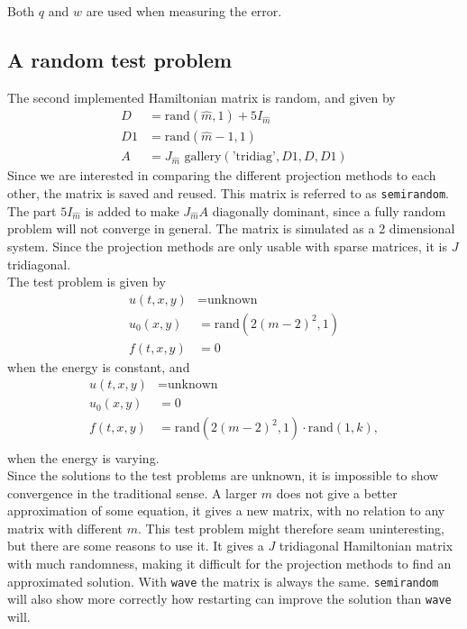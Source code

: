 \noindent Both $q$ and $w$ are used when measuring the error. \\

\subsection{A random test problem} %
The second implemented Hamiltonian matrix is random, and given by
\begin{equation*}
\begin{aligned}
D &= \text{rand}(\hat{m},1) + 5 I_{\hat{m}} \\
D1 & = \text{rand}(\hat{m}-1,1) \\
A &= J_{\hat{m}} \text{ gallery}(\text{'tridiag'},D1,D,D1)
\end{aligned}
\end{equation*}
Since we are interested in comparing the different projection methods to each other, the matrix is saved and reused. This matrix is referred to as \texttt{semirandom}. The part $5 I_{\hat{m}} $ is added to make $J_{\hat{m}}A$ diagonally dominant, since a fully random problem will not converge in general. The matrix is simulated as a 2 dimensional system. Since the projection methods are only usable with sparse matrices, it is $J$ tridiagonal.\\
The test problem is given by
\begin{equation*}
\begin{aligned}
u(t,x,y) &= \text{unknown} \\
u_0(x,y) &= \text{rand} (2 (m-2)^2,1) \\
f(t,x,y) &= 0
\end{aligned}
\end{equation*}
when the energy is constant, and 
\begin{equation*}
\begin{aligned}
u(t,x,y) &= \text{unknown} \\
u_0(x,y) &= 0 \\
f(t,x,y) &= \text{rand} (2 (m-2)^2,1) \cdot \text{rand}(1,k), \\
\end{aligned}
\end{equation*}
when the energy is varying.\\

\noindent Since the solutions to the test problems are unknown, it is impossible to show convergence in the traditional sense. A larger $m$ does not give a better approximation of some equation, it gives a new matrix, with no relation to any matrix with different $m$. This test problem might therefore seam uninteresting, but there are some reasons to use it. It gives a $J$ tridiagonal Hamiltonian matrix with much randomness, making it difficult for the projection methods to find an approximated solution. With \texttt{wave} the matrix is always the same. \texttt{semirandom} will also show more correctly how restarting can improve the solution than \texttt{wave} will.  \\

